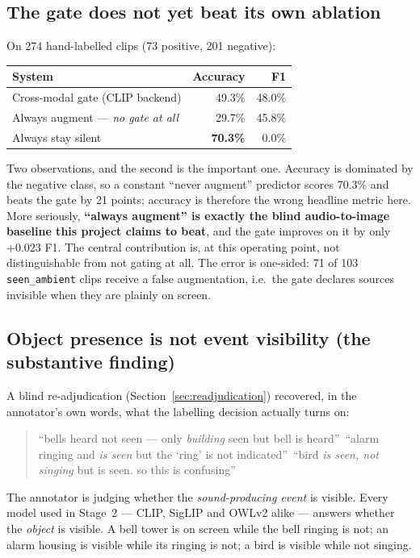 \documentclass[11pt,a4paper]{article}
\begin{document}
\subsection{The gate does not yet beat its own ablation}
On 274 hand-labelled clips (73 positive, 201 negative):

\begin{center}
\begin{tabular}{lrr}
\hline
System & Accuracy & F1 \\
\hline
Cross-modal gate (CLIP backend) & 49.3\% & 48.0\% \\
Always augment --- \emph{no gate at all} & 29.7\% & 45.8\% \\
Always stay silent & \textbf{70.3\%} & 0.0\% \\
\hline
\end{tabular}
\end{center}

\noindent Two observations, and the second is the important one. Accuracy is dominated
by the negative class, so a constant ``never augment'' predictor scores 70.3\% and beats
the gate by 21 points; accuracy is therefore the wrong headline metric here. More
seriously, \textbf{``always augment'' is exactly the blind audio-to-image baseline this
project claims to beat}, and the gate improves on it by only $+0.023$ F1. The central
contribution is, at this operating point, not distinguishable from not gating at all.
The error is one-sided: 71 of 103 \texttt{seen\_ambient} clips receive a false
augmentation, i.e.\ the gate declares sources invisible when they are plainly on screen.

\subsection{Object presence is not event visibility (the substantive finding)}
A blind re-adjudication (Section~\ref{sec:readjudication}) recovered, in the annotator's
own words, what the labelling decision actually turns on:

\begin{quote}\small
``bells heard not seen --- only \emph{building} seen but bell is heard''\
``alarm ringing and \emph{is seen} but the `ring' is not indicated''\
``bird \emph{is seen, not singing} but is seen. so this is confusing''
\end{quote}

\noindent The annotator is judging whether the \emph{sound-producing event} is visible.
Every model used in Stage~2 --- CLIP, SigLIP and OWLv2 alike --- answers whether the
\emph{object} is visible. A bell tower is on screen while the bell ringing is not; an
alarm housing is visible while its ringing is not; a bird is visible while not singing.
\end{document}
